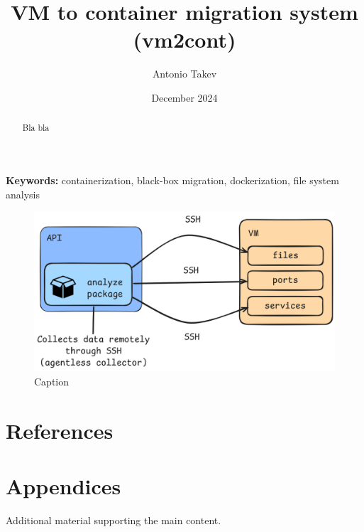 \documentclass[11pt, twocolumn]{article}
\title{
    VM to container migration system \\(vm2cont)
}
\author{
    Antonio Takev
}
\date{December 2024}
\begin{document}
\maketitle

\begin{abstract}
Bla bla
\end{abstract}

\textbf{Keywords:} containerization, black-box migration, dockerization, file system analysis


\begin{figure}
    \centering
    \includegraphics[width=0.5\linewidth]{images/agentless-collector.png}
    \caption{Caption}
    \label{fig:be}
\end{figure}

\section{References}
\nocite{*}


\section{Appendices}
Additional material supporting the main content.
\end{document}
